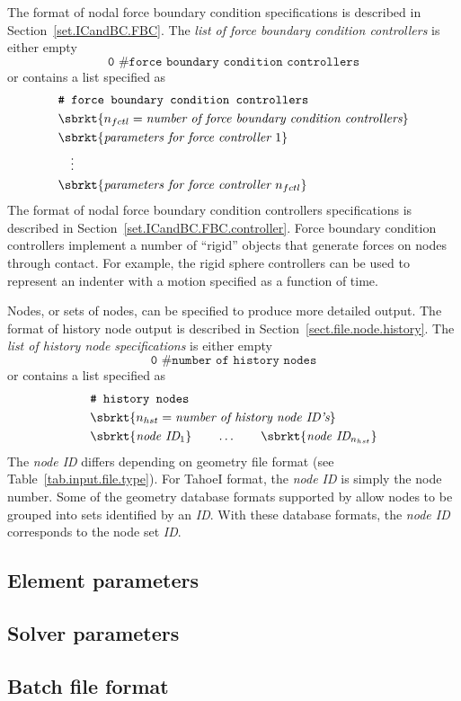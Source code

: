 The format of nodal force boundary condition specifications is described in
Section~\ref{set.ICandBC.FBC}.
The \textit{list of force boundary condition controllers} is either empty
\[ \texttt{0 \# force boundary condition controllers}\]	
or contains a list specified as
\begin{align}
& \texttt{\# force boundary condition controllers} \notag \\
& \sbrkt{n_{fctl} = \textit{number of force boundary condition controllers}} \notag \\
& \sbrkt{\textit{parameters for force controller~} 1} \notag \\
& \quad \vdots \notag \\
& \sbrkt{\textit{parameters for force controller~} n_{fctl}} \notag
\end{align}
The format of nodal force boundary condition controllers specifications is described in
Section~\ref{set.ICandBC.FBC.controller}.
Force boundary condition controllers implement a number of ``rigid'' 
objects that generate forces on nodes through contact. For example, 
the rigid sphere controllers can be used to represent an indenter 
with a motion specified as a function of time.

Nodes, or sets of nodes, can be specified to produce more detailed 
output. The format of history node output is described in 
Section~\ref{sect.file.node.history}.
The \textit{list of history node specifications} is either empty
\[ \texttt{0 \# number of history nodes}\]	
or contains a list specified as
\begin{align}
& \texttt{\# history nodes} \notag \\
& \sbrkt{n_{hst} = \textit{number of history node ID's}} \notag \\
& \sbrkt{\textit{node ID}_{1}} 
\qquad \ldots \qquad 
\sbrkt{\textit{node ID}_{n_{hst}}} \notag
\end{align}
The \textit{node ID} differs depending on geometry file format (see 
Table~\ref{tab.input.file.type}). For TahoeI format, the 
\textit{node ID} is simply the node number. Some of the geometry 
database formats supported by \tahoe allow nodes to be grouped into 
sets identified by an \textit{ID}. With these database formats, the 
\textit{node ID} corresponds to the node set \textit{ID}.

\subsection{Element parameters}

\subsection{Solver parameters}

\subsection{Batch file format}
